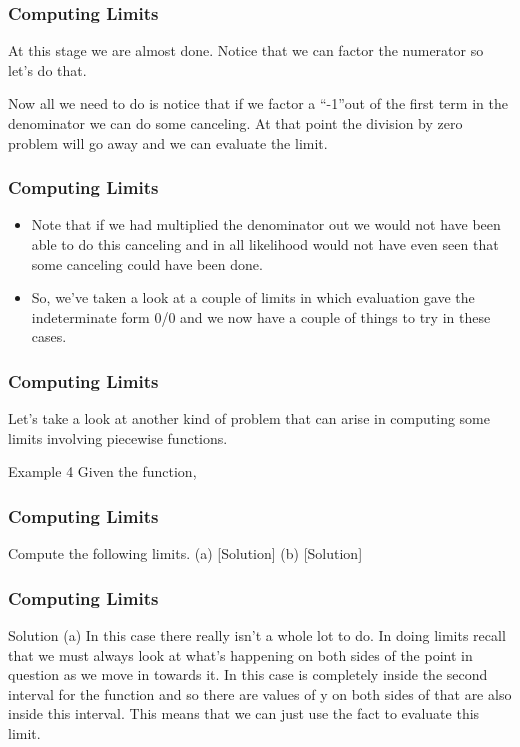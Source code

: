 \documentclass{beamer}
\begin{document}
\begin{frame}[fragile]
	\frametitle{Computing Limits}
	\Large
At this stage we are almost done.  Notice that we can factor the numerator so let’s do that.


Now all we need to do is notice that if we factor a “-1”out of the first term in the denominator we can do some canceling.  At that point the division by zero problem will go away and we can evaluate the limit.

\end{frame}
\begin{frame}[fragile]
	\frametitle{Computing Limits}
	\Large
\begin{itemize}
\item Note that if we had multiplied the denominator out we would not have been able to do this canceling and in all likelihood would not have even seen that some canceling could have been done.

\item So, we’ve taken a look at a couple of limits in which evaluation gave the indeterminate form 0/0 and we now have a couple of things to try in these cases.
\end{itemize}
\end{frame}
\begin{frame}[fragile]
	\frametitle{Computing Limits}
	\Large
Let’s take a look at another kind of problem that can arise in computing some limits involving piecewise functions.

Example 4  
Given the function,

\end{frame}
\begin{frame}[fragile]
	\frametitle{Computing Limits}
	\Large
Compute the following limits.
(a)    [Solution]
(b)    [Solution]

\end{frame}
\begin{frame}[fragile]
	\frametitle{Computing Limits}
	\Large
Solution
(a)  
In this case there really isn’t a whole lot to do.  In doing limits recall that we must always look at what’s happening on both sides of the point in question as we move in towards it.  In this case  is completely inside the second interval for the function and so there are values of y on both sides of  that are also inside this interval.  This means that we can just use the fact to evaluate this limit.
\end{frame}
\end{document}
